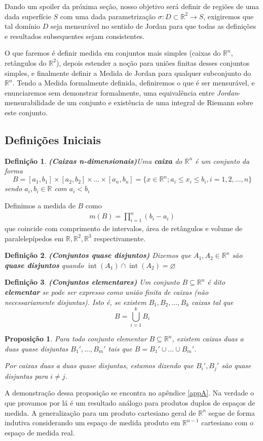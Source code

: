 \documentclass[12pt,letterpaper]{article}
\let\emptyset\varnothing
\newtheorem{proposition}{Proposição}
\newtheorem{defi}{Definição}
\newcommand{\real}{\mathbb{R}}
\newcommand{\rr}{\mathbb{R}^2}
\newcommand{\rn}{\mathbb{R}^n}
\newcommand{\op}[1]{\operatorname{#1}}
\begin{document}
	Dando um spoiler da próxima seção, nosso objetivo será definir de regiões de uma dada superfície $S$ com uma dada parametrização $\sigma:D\subset \rr\to S$, exigiremos que tal domínio $D$ seja mensurável no sentido de Jordan para que todas as definições e resultados subsequentes sejam consistentes.
	
	O que faremos é definir medida em conjuntos mais simples (caixas do $\rn$, retângulos do $\rr$), depois estender a noção para uniões finitas desses conjuntos simples, e finalmente definir a Medida de Jordan para qualquer subconjunto do $\rn$. Tendo a Medida formalmente definida, definiremos o que é ser mensurável, e enunciaremos sem demonstrar formalmente, uma equivalência entre \textit{Jordan}-mensurabilidade de um conjunto e existência de uma integral de Riemann sobre este conjunto.
	
	\subsection{Definições Iniciais}
	
	\begin{defi}\textbf{(Caixas n-dimensionais)}\label{box}
		Uma \textbf{caixa} do $\rn$ é um conjunto da forma
		$$B=[a_1,b_1]\times[a_2,b_2]\times\ldots\times[a_n,b_n]=\{x\in\rn;a_i\leq x_i\leq b_i,i=1,2,\ldots,n\}$$
		sendo $a_i,b_i\in\real$ com $a_i<b_i$
	\end{defi}
	Definimos a medida de $B$ como
	\begin{align*}
		m(B)=\prod_{i=1}^{n}(b_i-a_i)
	\end{align*}
	que coincide com comprimento de intervalos, área de retângulos e volume de paralelepípedos em $\real,\rr,\real^3$ respectivamente.
	
	\begin{defi} \textbf{(Conjuntos quase disjuntos)} Dizemos que $A_1,A_2\in\rn$ são \textbf{quase disjuntos} quando $\op{int}(A_1)\cap\op{int}(A_2)=\emptyset$
	\end{defi}
	
	\begin{defi} \textbf{(Conjuntos elementares)} Um conjunto $B\subseteq\rn$ é dito \textbf{elementar} se pode ser expresso como união finita de caixas (não necessariamente disjuntas). Isto é, se existem $B_1,B_2,\ldots,B_k$ caixas tal que 
		$$B=\displaystyle\bigcup_{i=1}^kB_i$$
	\end{defi}
	
	\begin{proposition}\label{elementary}
		Para todo conjunto elementar $B\subseteq\rn$, existem caixas duas a duas quase disjuntas $B_1',\ldots,B_m'$ tais que $B=B_1'\cup\ldots\cup B_m'$.
		
		Por caixas duas a duas quase disjuntas, estamos dizendo que $B_i',B_j'$ são quase disjuntas para $i\neq j$.
	\end{proposition}
	A demonstração dessa proposição se encontra no apêndice \ref{appA}. Na verdade o que provamos por lá é um resultado análogo para produtos duplos de espaços de medida. A generalização para um produto cartesiano geral de $\rn$ segue de forma indutiva considerando um espaço de medida produto em $\real^{n-1}$ cartesiano com o espaço de medida real.
	
\end{document}
